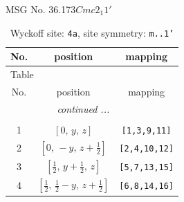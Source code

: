 \documentclass[fleqn,8pt]{jsarticle}
\begin{document}
\setcounter{MaxMatrixCols}{32}

\renewcommand{\tablename}{Table~}
\renewcommand{\figurename}{Figure~}
\begin{center}
\LARGE
MSG No. 36.173\quad$Cmc2_{1}1'$
\end{center}
\renewcommand{\arraystretch}{1.2}
\begin{longtable}{ccc}
\caption{Wyckoff site: {\tt 4a}, site symmetry: {\tt m..1'}}
 \\
 \hline \hline
No. & position & mapping \\ \hline \endfirsthead

\multicolumn{2}{l}{\tablename\ \thetable{}} \\
 \hline \hline
No. & position & mapping \\ \hline \endhead

 \hline \hline
\multicolumn{2}{r}{\footnotesize\it continued ...} \\ \endfoot

 \hline \hline
\multicolumn{2}{r}{} \\ \endlastfoot

1 & $\left[ 0,\, y,\, z \right]$ & {\tt [1,3,9,11]} \\ \hline
2 & $\left[ 0,\, - y,\, z + \frac{1}{2} \right]$ & {\tt [2,4,10,12]} \\ \hline
3 & $\left[ \frac{1}{2},\, y + \frac{1}{2},\, z \right]$ & {\tt [5,7,13,15]} \\ \hline
4 & $\left[ \frac{1}{2},\, \frac{1}{2} - y,\, z + \frac{1}{2} \right]$ & {\tt [6,8,14,16]} \\
\end{longtable}
\renewcommand{\arraystretch}{1.2}
\end{document}
